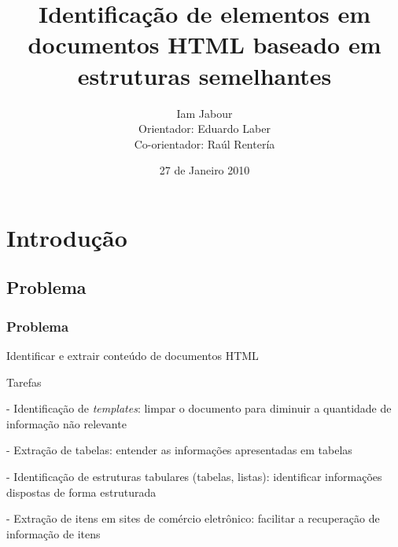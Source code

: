 \documentclass{beamer}
\title{Identificação de elementos em documentos HTML baseado em estruturas semelhantes}
\author[Iam Jabour]{Iam Jabour \\ Orientador: Eduardo Laber \\ Co-orientador: Raúl Rentería}
\institute[PUC-Rio]{
  Pontifícia Universidade Católica do Rio de Janeiro \\
}
\date{27 de Janeiro 2010}
\newenvironment{my_itemize}{
\begin{itemize}
  \setlength{\itemsep}{5pt}
  \setlength{\parskip}{2pt}
  \setlength{\parsep}{3pt}
}{\end{itemize}}
\begin{document}
\begin{frame}
  \titlepage
\end{frame}



\section{Introdução}
\begin{frame}
  \subsection{Problema}
  \frametitle{Problema}
  \begin{my_itemize}
   \item Identificar e extrair conteúdo de documentos HTML

   \item Tarefas
   \begin{my_itemize}
    \item[-] Identificação de \textit{templates}: limpar o documento para diminuir a quantidade de informação não relevante 

    \item[-] \alert{Extração de tabelas: entender as informações apresentadas em tabelas}

    \item[-] Identificação de estruturas tabulares (tabelas, listas): identificar informações dispostas de forma estruturada 

    \item[-] \alert{Extração de itens em sites de comércio eletrônico: facilitar a recuperação de informação de itens}
    \end{my_itemize}

  \end{my_itemize}
\end{frame}
\end{document}
